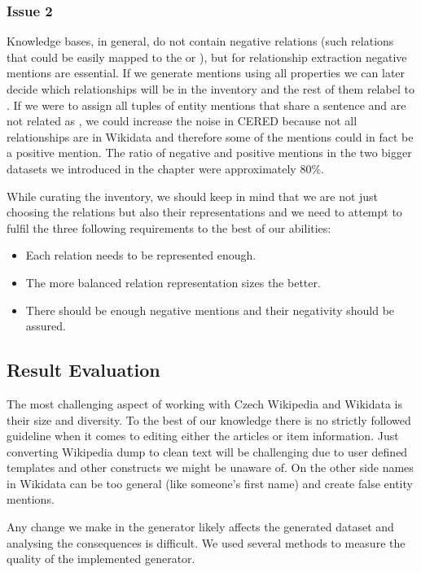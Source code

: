 \subsubsection{Issue 2}Knowledge bases, in general, do not contain negative relations (such relations that could be easily mapped to the  or ), but for relationship extraction negative mentions are essential. If we generate mentions using all properties we can later decide which relationships will be in the inventory and the rest of them relabel to . If we were to assign all tuples of entity mentions that share a sentence and are not related as , we could increase the noise in CERED because not all relationships are in Wikidata and therefore some of the  mentions could in fact be a positive mention. The ratio of negative and positive mentions in the two bigger datasets we introduced in the  chapter were approximately 80\%.

While curating the inventory, we should keep in mind that we are not just choosing the relations but also their representations and we need to attempt to fulfil the three following requirements to the best of our abilities:
\begin{itemize}
\item Each relation needs to be represented enough.
\item The more balanced relation representation sizes the better.
\item There should be enough negative mentions and their negativity should be assured.

\end{itemize}

\subsection{Result Evaluation}
\label{sec:implementaceevaluace}
The most challenging aspect of working with Czech Wikipedia and Wikidata is their size and diversity. To the best of our knowledge there is no strictly followed guideline when it comes to editing either the articles or item information. Just converting Wikipedia dump to clean text will be challenging due to user defined templates and other constructs we might be unaware of. On the other side names in Wikidata can be too general (like someone's first name) and create false entity mentions. 

Any change we make in the generator likely affects the generated dataset and analysing the consequences is difficult. We used several methods to measure the quality of the implemented generator.

